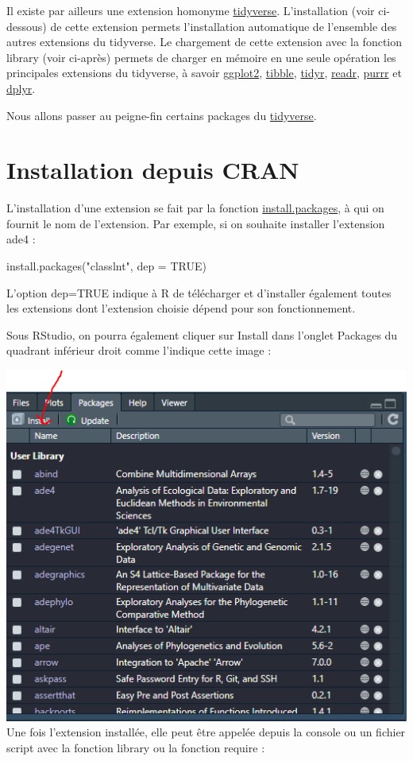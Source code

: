 \documentclass[
]{book}
\newenvironment{Shaded}{\begin{snugshade}}{\end{snugshade}}
\newcommand{\AttributeTok}[1]{\textcolor[rgb]{0.77,0.63,0.00}{#1}}
\newcommand{\ConstantTok}[1]{\textcolor[rgb]{0.00,0.00,0.00}{#1}}
\newcommand{\FunctionTok}[1]{\textcolor[rgb]{0.00,0.00,0.00}{#1}}
\newcommand{\NormalTok}[1]{#1}
\newcommand{\StringTok}[1]{\textcolor[rgb]{0.31,0.60,0.02}{#1}}
\begin{document}
Il existe par ailleurs une extension homonyme \href{http://rdrr.io/pkg/tidyverse}{tidyverse}. L'installation (voir ci-dessous) de cette extension permets l'installation automatique de l'ensemble des autres extensions du tidyverse. Le chargement de cette extension avec la fonction library (voir ci-après) permets de charger en mémoire en une seule opération les principales extensions du tidyverse, à savoir \href{(http://rdrr.io/pkg/ggplot2)}{ggplot2}, \href{http://rdrr.io/pkg/tibble}{tibble}, \href{http://rdrr.io/pkg/tidyr}{tidyr}, \href{http://rdrr.io/pkg/readr}{readr}, \href{http://rdrr.io/pkg/purrr}{purrr} et \href{http://rdrr.io/pkg/dplyr}{dplyr}.

Nous allons passer au peigne-fin certains packages du \href{http://rdrr.io/pkg/tidyverse}{tidyverse}.

\hypertarget{installation-depuis-cran}{%
\section{Installation depuis CRAN}\label{installation-depuis-cran}}

L'installation d'une extension se fait par la fonction \href{http://rdrr.io/pkg/utils/sym/install.packages}{install.packages}, à qui on fournit le nom de l'extension. Par exemple, si on souhaite installer l'extension ade4 :

\begin{Shaded}
\begin{Highlighting}[]
\FunctionTok{install.packages}\NormalTok{(}\StringTok{"classlnt"}\NormalTok{, }\AttributeTok{dep =} \ConstantTok{TRUE}\NormalTok{)}
\end{Highlighting}
\end{Shaded}

L'option dep=TRUE indique à R de télécharger et d'installer également toutes les extensions dont l'extension choisie dépend pour son fonctionnement.

Sous RStudio, on pourra également cliquer sur Install dans l'onglet Packages du quadrant inférieur droit comme l'indique cette image :

\includegraphics[width=0.7\linewidth]{images/packages}
Une fois l'extension installée, elle peut être appelée depuis la console ou un fichier script avec la fonction library ou la fonction require :
\end{document}
